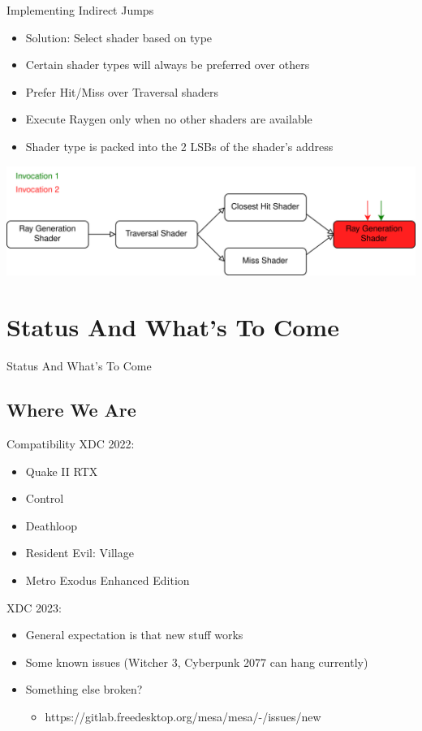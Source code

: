 \documentclass[aspectratio=169,t]{beamer}
\begin{document}
\begin{slide}{Implementing Indirect Jumps}
 \begin{itemize}
  \item Solution: Select shader based on type
  \item Certain shader types will always be preferred over others
  \item Prefer Hit/Miss over Traversal shaders
  \item Execute Raygen only when no other shaders are available
  \item Shader type is packed into the 2 LSBs of the shader's address
 \end{itemize}
 \includegraphics[width=\textwidth]{graphics/RTStages2-8.png}
\end{slide}

\section{Status And What's To Come}

\chapterIntroConfig
\begin{slide}{Status And What's To Come}
\end{slide}

\subsection{Where We Are}
\begin{slide}{Compatibility}
 XDC 2022: \\
 \begin{itemize}
  \item Quake II RTX
  \item Control
  \item Deathloop
  \item Resident Evil: Village
  \item Metro Exodus Enhanced Edition
 \end{itemize}

 \pause

 \vspace{12pt}

 XDC 2023: \\
 \begin{itemize}
  \item General expectation is that new stuff works
  \item Some known issues (Witcher 3, Cyberpunk 2077 can hang currently)
  \item Something else broken?
  \begin{itemize}
   \item https://gitlab.freedesktop.org/mesa/mesa/-/issues/new
  \end{itemize}
 \end{itemize}
\end{slide}
\end{document}

